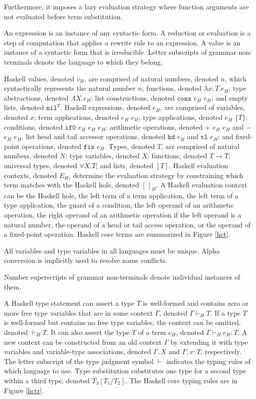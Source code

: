 Furthermore, it imposes a lazy evaluation strategy where function arguments are not evaluated before term substitution.

An expression is an instance of any syntactic form.  A reduction or evaluation is a step of computation that applies a rewrite rule to an expression.  A value is an instance of a syntactic form that is irreducible.  Letter subscripts of grammar non-terminals denote the language to which they belong.

Haskell values, denoted $v_{H}$, are comprised of natural numbers, denoted $\overline{n}$, which syntactically represents the natural number $n$; functions, denoted $\lambda x:T.e_{H}$; type abstractions, denoted $\Lambda X.e_{H}$; list constructions, denoted $\mathtt{cons}$ $e_{H}$ $e_{H}$; and empty lists, denoted $\mathtt{nil}^{T}$.  Haskell expressions, denoted $e_{H}$, are comprised of variables, denoted $x$; term applications, denoted $e_{H}$ $e_{H}$; type applications, denoted $e_{H}$ $\lbrace T\rbrace$; conditions, denoted $\mathtt{if0}$ $e_{H}$ $e_{H}$ $e_{H}$; arithmetic operations, denoted $+$ $e_{H}$ $e_{H}$ and $-$ $e_{H}$ $e_{H}$, list head and tail accessor operations, denoted $\mathtt{hd}$ $e_{H}$ and $\mathtt{tl}$ $e_{H}$; and fixed-point operations, denoted $\mathtt{fix}$ $e_{H}$.  Types, denoted $T$, are comprised of natural numbers, denoted $N$; type variables, denoted $X$; functions, denoted $T\rightarrow T$; universal types, denoted $\forall X.T$; and lists, denoted $[T]$.  Haskell evaluation contexts, denoted $E_{H}$, determine the evaluation strategy by constraining which term matches with the Haskell hole, denoted $[\,]_{H}$.  A Haskell evaluation context can be the Haskell hole, the left term of a term application, the left term of a type application, the guard of a condition, the left operand of an arithmetic operation, the right operand of an arithmetic operation if the left operand is a natural number, the operand of a head or tail access operation, or the operand of a fixed-point operation.  Haskell core terms are summarized in Figure \ref{hct}.



All variables and type variables in all languages must be unique.  Alpha conversion is implicitly used to resolve name conflicts.

Number superscripts of grammar non-terminals denote individual instances of them.

A Haskell type statement can assert a type $T$ is well-formed and contains zero or more free type variables that are in some context $\Gamma$, denoted $\Gamma\vdash_{H}T$.  If a type $T$ is well-formed but contains no free type variables, the context can be omitted, denoted $\vdash_{H}T$.  It can also assert the type $T$ of a term $e_{H}$, denoted $\Gamma\vdash_{H}e_{H}:T$.  A new context can be constructed from an old context $\Gamma$ by extending it with type variables and variable-type associations, denoted $\Gamma,X$ and $\Gamma,x:T$, respectively.  The letter subscript of the type judgment symbol $\vdash$ indicates the typing rules of which language to use.  Type substitution substitutes one type for a second type within a third type, denoted $T_{3}[T_{1}/T_{2}]$.  The Haskell core typing rules are in Figure \ref{hctr}.


